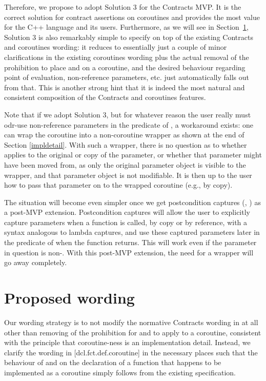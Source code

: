 Therefore, we propose to adopt Solution 3 for the Contracts MVP. It is the correct solution for contract assertions on coroutines and provides the most value for the C++ language and its users. Furthermore, as we will see in Section~\ref{wording}, Solution 3 is also remarkably simple to specify on top of the existing Contracts and coroutines wording: it reduces to essentially just a couple of minor clarifications in the existing coroutines wording plus the actual removal of the prohibition to place  and  on a coroutine, and the desired behaviour regarding point of evaluation, non-reference parameters, etc. just automatically falls out from that. This is another strong hint that it is indeed the most natural and consistent composition of the Contracts and coroutines features.

Note that if we adopt Solution 3, but for whatever reason the user really must odr-use non-reference parameters in the predicate of , a workaround exists: one can wrap the coroutine into a non-coroutine wrapper as shown at the end of Section \ref{impldetail}. With such a wrapper, there is no question as to whether  applies to the original or copy of the parameter, or whether that parameter might have been moved from, as only the original parameter object is visible to the wrapper, and that parameter object is not modifiable. It is then up to the user how to pass that parameter on to the wrapped coroutine (e.g., by copy).

The situation will become even simpler once we get postcondition captures (\cite{P2461R1}, \cite{P3098R0}) as a post-MVP extension. Postcondition captures will allow the user to explicitly capture parameters when a function is called, by copy or by reference, with a syntax analogous to lambda captures, and use these captured parameters later in the predicate of  when the function returns. This will work even if the parameter in question is non-. With this post-MVP extension, the need for a wrapper will go away completely.

\section{Proposed wording}
\label{wording}

Our wording strategy is to not modify the normative Contracts wording in \cite{P2900R8} at all other than removing of the prohibition for  and  to apply to a coroutine, consistent with the principle that coroutine-ness is an implementation detail. Instead, we clarify the wording in [dcl.fct.def.coroutine] in the necessary places such that the behaviour of  and  on the declaration of a function that happens to be implemented as a coroutine simply follows from the existing specification.


